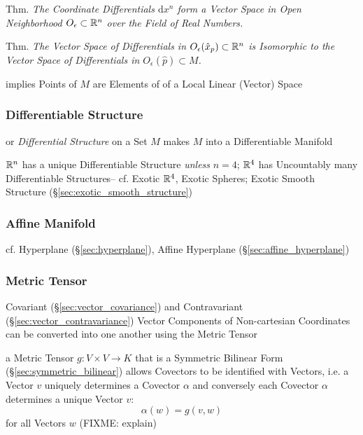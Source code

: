 Thm. \emph{The Coordinate Differentials $\mathrm{d}x^n$ form a Vector Space in
  Open Neighborhood $O_\epsilon \subset \mathbb{R}^n$ over the Field of Real
  Numbers.}

Thm. \emph{The Vector Space of Differentials in $O_\epsilon(\hat{x}_p) \subset
  \mathbb{R}^n$ is Isomorphic to the Vector Space of Differentials in
  $O_\epsilon(\hat{p}) \subset M$.}

implies Points of $M$ are Elements of of a Local Linear (Vector) Space



\subsubsection{Differentiable Structure}\label{sec:differentiable_structure}

or \emph{Differential Structure} on a Set $M$ makes $M$ into a Differentiable
Manifold

$\mathbb{R}^n$ has a unique Differentiable Structure \emph{unless} $n = 4$;
$\mathbb{R}^4$ has Uncountably many Differentiable Structures-- cf. Exotic
$\mathbb{R}^4$, Exotic Spheres; Exotic Smooth Structure
(\S\ref{sec:exotic_smooth_structure})



\subsubsection{Affine Manifold}\label{sec:affine_manifold}

cf. Hyperplane (\S\ref{sec:hyperplane}), Affine Hyperplane
(\S\ref{sec:affine_hyperplane})



\subsubsection{Metric Tensor}\label{sec:metric_tensor}

Covariant (\S\ref{sec:vector_covariance}) and Contravariant
(\S\ref{sec:vector_contravariance}) Vector Components of Non-cartesian
Coordinates can be converted into one another using the Metric Tensor

a Metric Tensor $g : V \times V \rightarrow K$ that is a Symmetric Bilinear Form
(\S\ref{sec:symmetric_bilinear}) allows Covectors to be identified with Vectors,
i.e. a Vector $v$ uniquely determines a Covector $\alpha$ and conversely each
Covector $\alpha$ determines a unique Vector $v$:
\[
  \alpha (w) = g (v,w)
\]
for all Vectors $w$
(FIXME: explain)

